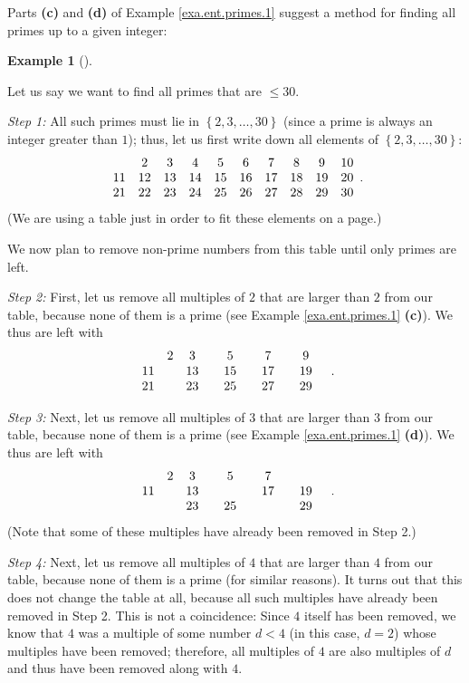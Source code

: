 \documentclass[numbers=enddot,12pt,final,onecolumn,notitlepage]{scrartcl}%
\numberwithin{exer}{subsection}
\theoremstyle{definition}
\newtheorem{exam}[theo]{Example}
\newenvironment{example}[1][]
{\begin{exam}[#1]\begin{leftbar}}
{\end{leftbar}\end{exam}}
\begin{document}
Parts \textbf{(c)} and \textbf{(d)} of Example \ref{exa.ent.primes.1} suggest
a method for finding all primes up to a given integer:

\begin{example}
Let us say we want to find all primes that are $\leq30$.

\textit{Step 1:} All such primes must lie in $\left\{  2,3,\ldots,30\right\}
$ (since a prime is always an integer greater than $1$); thus, let us first
write down all elements of $\left\{  2,3,\ldots,30\right\}  $:%
\[%
\begin{array}
[c]{cccccccccc}
& 2 & 3 & 4 & 5 & 6 & 7 & 8 & 9 & 10\\
11 & 12 & 13 & 14 & 15 & 16 & 17 & 18 & 19 & 20\\
21 & 22 & 23 & 24 & 25 & 26 & 27 & 28 & 29 & 30
\end{array}
.
\]
(We are using a table just in order to fit these elements on a page.)

We now plan to remove non-prime numbers from this table until only primes are left.

\textit{Step 2:} First, let us remove all multiples of $2$ that are larger
than $2$ from our table, because none of them is a prime (see Example
\ref{exa.ent.primes.1} \textbf{(c)}). We thus are left with%
\[%
\begin{array}
[c]{cccccccccc}
& 2 & 3 &  & 5 &  & 7 &  & 9 & \\
11 &  & 13 &  & 15 &  & 17 &  & 19 & \\
21 &  & 23 &  & 25 &  & 27 &  & 29 &
\end{array}
.
\]


\textit{Step 3:} Next, let us remove all multiples of $3$ that are larger than
$3$ from our table, because none of them is a prime (see Example
\ref{exa.ent.primes.1} \textbf{(d)}). We thus are left with%
\[%
\begin{array}
[c]{cccccccccc}
& 2 & 3 &  & 5 &  & 7 &  &  & \\
11 &  & 13 &  &  &  & 17 &  & 19 & \\
&  & 23 &  & 25 &  &  &  & 29 &
\end{array}
.
\]
(Note that some of these multiples have already been removed in Step 2.)

\textit{Step 4:} Next, let us remove all multiples of $4$ that are larger than
$4$ from our table, because none of them is a prime (for similar reasons). It
turns out that this does not change the table at all, because all such
multiples have already been removed in Step 2. This is not a coincidence:
Since $4$ itself has been removed, we know that $4$ was a multiple of some
number $d<4$ (in this case, $d=2$) whose multiples have been removed;
therefore, all multiples of $4$ are also multiples of $d$ and thus have been
removed along with $4$.


\end{example}
\end{document}
